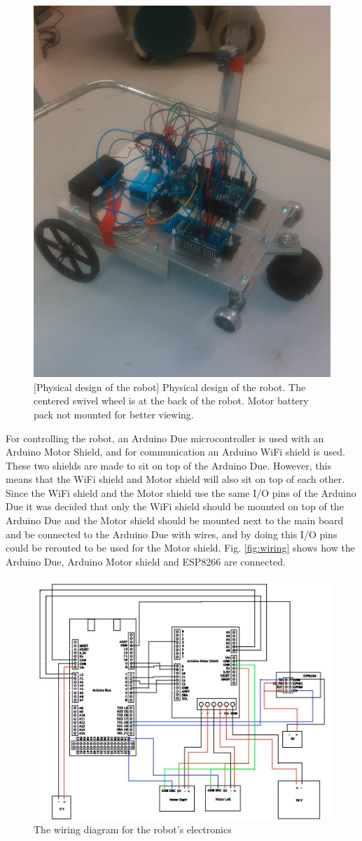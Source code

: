 \documentclass[11pt]{article}
\begin{document}
\begin{figure}[ht]
  \centering
  \includegraphics[width=.6\textwidth]{figures/robot.jpg}
  [Physical design of the robot]{\label{fig:robot} Physical design of the robot. The centered swivel wheel is at the back
    of the robot. Motor battery pack not mounted for better viewing.}
\end{figure}


For controlling the robot, an Arduino Due microcontroller is used with an
Arduino Motor Shield, and for communication an Arduino WiFi shield is used. These
two shields are made to sit on top of the Arduino Due. However, this means that
the WiFi shield and Motor shield will also sit on top of each other. Since the
WiFi shield and the Motor shield use the same I/O pins of the Arduino Due it was
decided that only the WiFi shield should be mounted on top of the Arduino Due
and the Motor shield should be mounted next to the main board and be connected
to the Arduino Due with wires, and by doing this I/O pins could be rerouted to
be used for the Motor shield. Fig. \vref{fig:wiring} shows how the Arduino Due,
Arduino Motor shield and ESP8266 are connected. \par

\begin{figure}[ht]
  \centering
  \includegraphics[width=.75\textwidth]{figures/wiring.jpg}
  \caption{\label{fig:wiring} The wiring diagram for the robot's electronics}
\end{figure}
\end{document}
